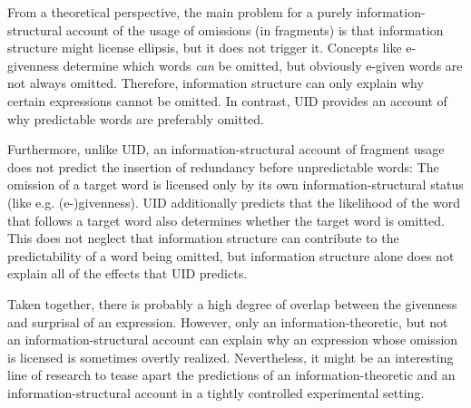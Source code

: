 From a theoretical perspective, the main problem for a purely information-structural account of the usage of omissions (in fragments) is that information structure might license ellipsis, but it does not trigger it. Concepts like e-givenness determine which words \textit{can} be omitted, but obviously e-given words are not always omitted. Therefore, information structure can only explain why certain expressions cannot be omitted. In contrast, UID provides an account of why predictable words are preferably omitted.

Furthermore, unlike UID, an information-structural account of fragment usage does not predict the insertion of redundancy before unpredictable words: The omission of a target word is licensed only by its own information-structural status (like e.g. (e-)givenness). UID additionally predicts that the likelihood of the word that follows a target word also determines whether the target word is omitted. This does not neglect that information structure can contribute to the predictability of a word being omitted, but information structure alone does not explain all of the effects that UID predicts.

Taken together, there is probably a high degree of overlap between the givenness and surprisal of an expression. However, only an information-theoretic, but not an information-structural account can explain why an expression whose omission is licensed is sometimes overtly realized. Nevertheless, it might be an interesting line of research to tease apart the predictions of an information-theoretic and an information-structural account in a tightly controlled experimental setting.